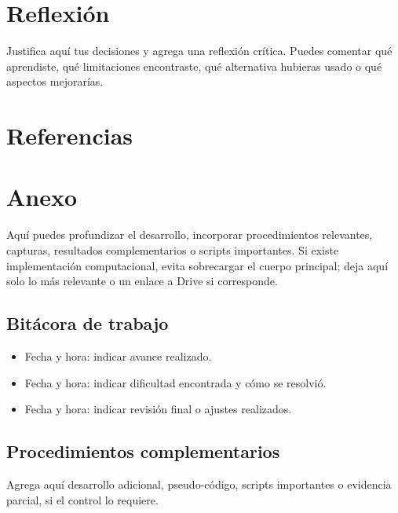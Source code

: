 \documentclass[10pt,letterpaper]{article}
\begin{document}
\section*{Reflexión}
Justifica aquí tus decisiones y agrega una reflexión crítica. Puedes comentar qué aprendiste, qué limitaciones encontraste, qué alternativa hubieras usado o qué aspectos mejorarías.

\section*{Referencias}
\printbibliography[heading=none]

\newpage
\appendix
\section*{Anexo}
Aquí puedes profundizar el desarrollo, incorporar procedimientos relevantes, capturas, resultados complementarios o scripts importantes. Si existe implementación computacional, evita sobrecargar el cuerpo principal; deja aquí solo lo más relevante o un enlace a Drive si corresponde.

\subsection*{Bitácora de trabajo}
\begin{itemize}
    \item Fecha y hora: indicar avance realizado.
    \item Fecha y hora: indicar dificultad encontrada y cómo se resolvió.
    \item Fecha y hora: indicar revisión final o ajustes realizados.
\end{itemize}

\subsection*{Procedimientos complementarios}
Agrega aquí desarrollo adicional, pseudo-código, scripts importantes o evidencia parcial, si el control lo requiere.
\end{document}
